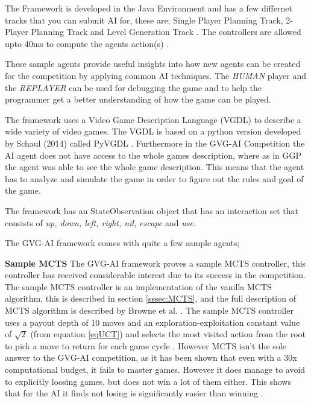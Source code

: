 \documentclass[journal]{IEEEtran}
\begin{document}
		The Framework is developed in the Java Environment and has a few differnet tracks that you can submit AI for, these are; Single Player Planning Track, 2-Player Planning Track and Level Generation Track \cite{gaina2016general}.
		The controllers are allowed upto 40ms to compute the agents action(s) \cite{perez2016GVGAICompetition, GVGAI}.
		
		
		These sample agents provide useful insights into how new agents can be created for the competition by applying common AI techniques.
		The \textit{HUMAN} player and the \textit{REPLAYER} can be used for debugging the game and to help the programmer get a better understanding of how the game can be played.
		
		
		The framework uses a Video Game Description Language (VGDL) to describe a wide variety of video games. The VGDL is based on a python version developed by Schaul (2014) called PyVGDL \cite{schuster2015mcts}. Furthermore in the GVG-AI Competition the AI agent does not have access to the whole games description, where as in GGP the agent was able to see the whole game description. This means that the agent has to analyze and simulate the game in order to figure out the rules and goal of the game.
		
		
		The framework has an StateObservation object that has an interaction set that consists of \textit{up, down, left, right, nil, escape} and \textit{use}.

		The GVG-AI framework comes with quite a few sample agents;
		
		\textbf{Sample MCTS} \label{sssec:sampleMCTS}
			The GVG-AI framework proves a sample MCTS controller, this controller has received considerable interest due to its success in the competition. 
			The sample MCTS controller is an implementation of the vanilla MCTS algorithm, this is described in section \ref{sssec:MCTS}, and the full description of MCTS algorithm is described by Browne et al. \cite{browne2012survey}.
			The sample MCTS controller uses a payout depth of 10 moves and an exploration-exploitation constant value of $\sqrt{2}$ (from equation \ref{eqUCT}) and selects the most visited action from the root to pick a move to return for each game cycle \cite{perez20162014}.
			However MCTS isn't the sole answer to the GVG-AI competition, as it has been shown that even with a 30x computational budget, it fails to master games. However it does manage to avoid to explicitly loosing games, but does not win a lot of them either. This shows that for the AI it finds not losing is significantly easier than winning \cite{nelson2016investigating}.
\end{document}
